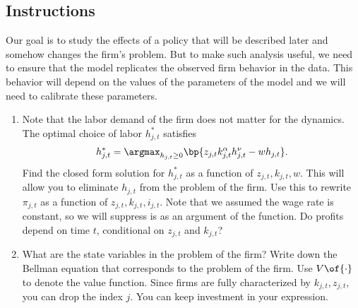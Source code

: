 \documentclass[english,hyperref={pdftex,pdfpagemode=UseNone,hidelinks}]{tufte-handout}
\begin{document}
\subsection*{Instructions}
Our goal is to study the effects of a policy that will be described later and somehow changes the firm's problem. But to make such analysis useful, we need to ensure that the model replicates the observed firm behavior in the data. This behavior will depend on the values of the parameters of the model and we will need to calibrate these parameters.


\begin{enumerate}
    \item Note that the labor demand of the firm does not matter for the dynamics. The optimal choice of labor $h_{j,t}^*$ satisfies \begin{align*} 
        h_{j,t}^* = \argmax_{h_{j,t}\geq 0} \bp{z_{j,t} k_{j,t}^\alpha h_{j,t}^\nu - w h_{j,t}}.
    \end{align*} Find the closed form solution for $h_{j,t}^*$ as a function of $z_{j,t}, k_{j,t}, w$. This will allow you to eliminate $h_{j,t}$ from the problem of the firm. Use this to rewrite $\pi_{j,t}$ as a function of $z_{j,t}, k_{j,t}, i_{j,t}$. Note that we assumed the wage rate is constant, so we will suppress is as an argument of the function.  Do profits depend on time $t$, conditional on $z_{j,t}$ and $k_{j,t}$?
    \item What are the state variables in the problem of the firm? Write down the Bellman equation that corresponds to the problem of the firm. Use $V\of{\cdot}$ to denote the value function. Since firms are fully characterized by $k_{j,t}, z_{j,t}$, you can drop the index $j$. You can keep investment in your expression.  
    

\end{enumerate}
\end{document}

